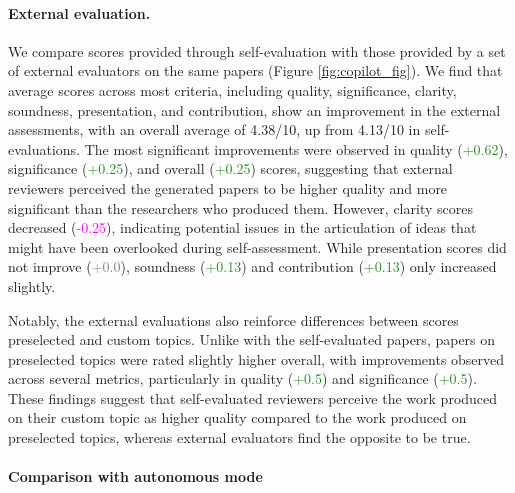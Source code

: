 \documentclass[11pt, a4paper]{gdm_format}
\begin{document}
\paragraph{External evaluation.} We compare scores provided through self-evaluation with those provided by a set of external evaluators on the same papers (Figure \ref{fig:copilot_fig}). We find that average scores across most criteria, including quality, significance, clarity, soundness, presentation, and contribution, show an improvement in the external assessments, with an overall average of 4.38/10, up from 4.13/10 in self-evaluations. The most significant improvements were observed in quality (\textcolor{ForestGreen}{+0.62}), significance (\textcolor{ForestGreen}{+0.25}), and overall (\textcolor{ForestGreen}{+0.25}) scores, suggesting that external reviewers perceived the generated papers to be higher quality and more significant than the researchers who produced them. However, clarity scores decreased (\textcolor{Magenta}{-0.25}), indicating potential issues in the articulation of ideas that might have been overlooked during self-assessment. While presentation scores did not improve (\textcolor{Gray}{+0.0}), soundness (\textcolor{ForestGreen}{+0.13}) and contribution (\textcolor{ForestGreen}{+0.13}) only increased slightly.

Notably, the external evaluations also reinforce differences between scores preselected and custom topics. Unlike with the self-evaluated papers, papers on preselected topics were rated slightly higher overall, with improvements observed across several metrics, particularly in quality (\textcolor{ForestGreen}{+0.5}) and significance (\textcolor{ForestGreen}{+0.5}). 
These findings suggest that self-evaluated reviewers perceive the work produced on their custom topic as higher quality compared to the work produced on preselected topics, whereas external evaluators find the opposite to be true. 

\paragraph{Comparison with autonomous mode}
\end{document}
